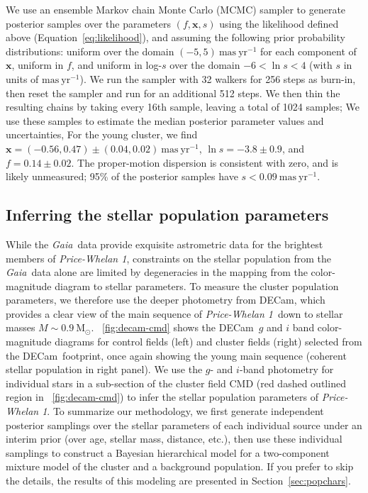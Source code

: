 \documentclass[twocolumn]{aastex62}
\newcommand{\gaia}{\textsl{Gaia}}
\newcommand{\decam}{DECam}
\newcommand{\bs}[1]{\boldsymbol{#1}}
\newcommand{\sectionname}{Section}
\newcommand{\equationname}{Equation}
\newcommand{\msun}{\textrm{M}_\odot}
\newcommand{\masyr}{\ensuremath{\textrm{mas}~\textrm{yr}^{-1}}}
\newcommand{\clustername}{\textsl{Price-Whelan 1}}
\begin{document}
We use an ensemble Markov chain Monte Carlo (MCMC) sampler \citep[\texttt{emcee};][]{emcee, Goodman:2010} to generate posterior samples over the parameters $(f, \bs{x}, s)$ using the likelihood defined above (\equationname~\ref{eq:likelihood}), and assuming the following prior probability distributions: uniform over the domain $(-5, 5)~\masyr$ for each component of $\bs{x}$, uniform in $f$, and uniform in log-$s$ over the domain $-6 < \ln s < 4$ (with $s$ in units of \masyr).
We run the sampler with 32 walkers for 256 steps as burn-in, then reset the sampler and run for an additional 512 steps.
We then thin the resulting chains by taking every 16th sample, leaving a total of 1024 samples; We use these samples to estimate the median posterior parameter values and uncertainties,
For the young cluster, we find $\bs{x} = (-0.56,  0.47) \pm (0.04, 0.02)~\masyr$, $\ln s = -3.8 \pm 0.9$, and $f = 0.14 \pm 0.02$.
The proper-motion dispersion is consistent with zero, and is likely unmeasured; 95\% of the posterior samples have $s < 0.09~\masyr$.


\subsection{Inferring the stellar population parameters}
\label{sec:popmodel}

While the \gaia\ data provide exquisite astrometric data for the brightest members of \clustername, constraints on the stellar population from the \gaia\ data alone are limited by degeneracies in the mapping from the color-magnitude diagram to stellar parameters.
To measure the cluster population parameters, we therefore use the deeper photometry from \decam, which provides a clear view of the main sequence of \clustername\ down to stellar masses $M \sim 0.9~\msun$.
\figurename~\ref{fig:decam-cmd} shows the \decam\ $g$ and $i$ band color-magnitude diagrams for control fields (left) and cluster fields (right) selected from the \decam\ footprint, once again showing the young main sequence (coherent stellar population in right panel).
We use the $g$- and $i$-band photometry for individual stars in a sub-section of the cluster field CMD (red dashed outlined region in \figurename~\ref{fig:decam-cmd}) to infer the stellar population parameters of \clustername.
To summarize our methodology, we first generate independent posterior samplings over the stellar parameters of each individual source under an interim prior (over age, stellar mass, distance, etc.), then use these individual samplings to construct a Bayesian hierarchical model for a two-component mixture model of the cluster and a background population.
If you prefer to skip the details, the results of this modeling are presented in \sectionname~\ref{sec:popchars}.
\end{document}
